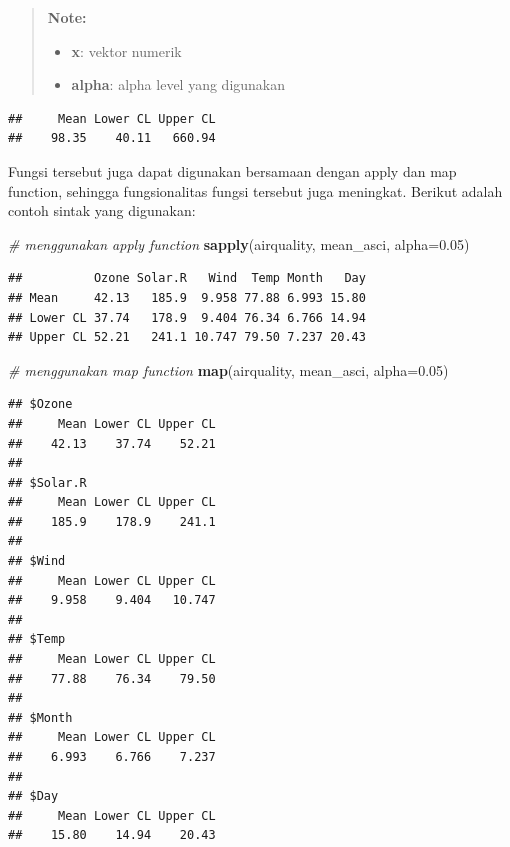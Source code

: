 \documentclass[]{book}
\newenvironment{Shaded}{\begin{snugshade}}{\end{snugshade}}
\newcommand{\KeywordTok}[1]{\textcolor[rgb]{0.13,0.29,0.53}{\textbf{#1}}}
\newcommand{\DataTypeTok}[1]{\textcolor[rgb]{0.13,0.29,0.53}{#1}}
\newcommand{\FloatTok}[1]{\textcolor[rgb]{0.00,0.00,0.81}{#1}}
\newcommand{\CommentTok}[1]{\textcolor[rgb]{0.56,0.35,0.01}{\textit{#1}}}
\newcommand{\OperatorTok}[1]{\textcolor[rgb]{0.81,0.36,0.00}{\textbf{#1}}}
\newcommand{\NormalTok}[1]{#1}
\providecommand{\tightlist}{%
  \setlength{\itemsep}{0pt}\setlength{\parskip}{0pt}}
\begin{document}
\begin{quote}
\textbf{Note: }

\begin{itemize}
\tightlist
\item
  \textbf{x}: vektor numerik
\item
  \textbf{alpha}: alpha level yang digunakan
\end{itemize}
\end{quote}

\begin{Shaded}
\end{Shaded}

\begin{verbatim}
##     Mean Lower CL Upper CL 
##    98.35    40.11   660.94
\end{verbatim}

Fungsi tersebut juga dapat digunakan bersamaan dengan apply dan map
function, sehingga fungsionalitas fungsi tersebut juga meningkat.
Berikut adalah contoh sintak yang digunakan:

\begin{Shaded}
\begin{Highlighting}[]
\CommentTok{# menggunakan apply function}
\KeywordTok{sapply}\NormalTok{(airquality, mean_asci, }\DataTypeTok{alpha=}\FloatTok{0.05}\NormalTok{)}
\end{Highlighting}
\end{Shaded}

\begin{verbatim}
##          Ozone Solar.R   Wind  Temp Month   Day
## Mean     42.13   185.9  9.958 77.88 6.993 15.80
## Lower CL 37.74   178.9  9.404 76.34 6.766 14.94
## Upper CL 52.21   241.1 10.747 79.50 7.237 20.43
\end{verbatim}

\begin{Shaded}
\begin{Highlighting}[]
\CommentTok{# menggunakan map function}
\KeywordTok{map}\NormalTok{(airquality, mean_asci, }\DataTypeTok{alpha=}\FloatTok{0.05}\NormalTok{)}
\end{Highlighting}
\end{Shaded}

\begin{verbatim}
## $Ozone
##     Mean Lower CL Upper CL 
##    42.13    37.74    52.21 
## 
## $Solar.R
##     Mean Lower CL Upper CL 
##    185.9    178.9    241.1 
## 
## $Wind
##     Mean Lower CL Upper CL 
##    9.958    9.404   10.747 
## 
## $Temp
##     Mean Lower CL Upper CL 
##    77.88    76.34    79.50 
## 
## $Month
##     Mean Lower CL Upper CL 
##    6.993    6.766    7.237 
## 
## $Day
##     Mean Lower CL Upper CL 
##    15.80    14.94    20.43
\end{verbatim}
\end{document}
